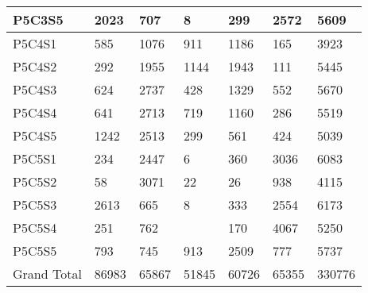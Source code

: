 \begin{longtable}{|l|l|l|l|l|l|l|}
P5C3S5 & 2023 & 707 & 8 & 299 & 2572 & 5609 \\ \hline
P5C4S1 & 585 & 1076 & 911 & 1186 & 165 & 3923 \\ \hline
P5C4S2 & 292 & 1955 & 1144 & 1943 & 111 & 5445 \\ \hline
P5C4S3 & 624 & 2737 & 428 & 1329 & 552 & 5670 \\ \hline
P5C4S4 & 641 & 2713 & 719 & 1160 & 286 & 5519 \\ \hline
P5C4S5 & 1242 & 2513 & 299 & 561 & 424 & 5039 \\ \hline
P5C5S1 & 234 & 2447 & 6 & 360 & 3036 & 6083 \\ \hline
P5C5S2 & 58 & 3071 & 22 & 26 & 938 & 4115 \\ \hline
P5C5S3 & 2613 & 665 & 8 & 333 & 2554 & 6173 \\ \hline
P5C5S4 & 251 & 762 &  & 170 & 4067 & 5250 \\ \hline
P5C5S5 & 793 & 745 & 913 & 2509 & 777 & 5737 \\ \hline
Grand Total & 86983 & 65867 & 51845 & 60726 & 65355 & 330776 \\ \hline
\end{longtable}

